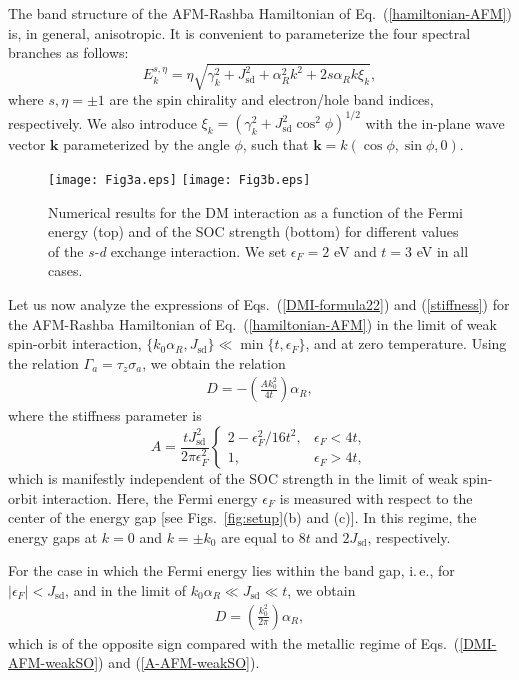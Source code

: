 \documentclass[aps,prl,twocolumn,amsmath,amssymb,superscriptaddress]{revtex4}%
\newcommand{\be}{\begin{equation}}
\newcommand{\e}{\end{equation}}
\newcommand{\bc}{\begin{cases}}
\newcommand{\ec}{\end{cases}}
\newcommand{\lt}{\left}
\newcommand{\rt}{\right}
\begin{document}
The band structure of the AFM-Rashba Hamiltonian of Eq.~(\ref{hamiltonian-AFM}) is, in general, anisotropic. It is convenient to parameterize the four spectral branches as follows:
\be
\label{energy-AFM}
E^{s,\eta}_k=\eta \sqrt{\gamma^2_k+J^2_{\mathrm{sd}}+\alpha^2_R k^2+2 s \alpha_R k \xi_k},
\e
where $s, \eta=\pm 1$ are the spin chirality and electron/hole band indices, respectively. We also introduce $\xi_k=\lt(\gamma^2_k+J^2_{\mathrm{sd}} \cos^2\phi\rt)^{1/2}$ with the in-plane wave vector $\bm{k}$ parameterized by the angle $\phi$, such that $\bm{k}=k(\cos\phi,\sin\phi,0)$.

\begin{figure}[t]
\texttt{[image: Fig3a.eps]}
\texttt{[image: Fig3b.eps]}
\caption{Numerical results for the DM interaction as a function of the Fermi energy (top) and of the SOC strength (bottom) for different values of the \textit{s-d} exchange interaction. We set $\epsilon_F=2$ eV and $t=3$ eV in all cases.}
\label{fig:results}
\end{figure}


Let us now analyze the expressions of Eqs.~(\ref{DMI-formula22}) and (\ref{stiffness}) for the AFM-Rashba Hamiltonian of Eq.~(\ref{hamiltonian-AFM}) in the limit of weak spin-orbit interaction, $\{k_0 \alpha_R, J_\mathrm{sd}\} \ll \min\{t, \epsilon_F\}$, and at zero temperature. Using the relation $\Gamma_a=\tau_z\sigma_a$, we obtain the relation
\begin{align}
\label{DMI-AFM-weakSO}
D = -\left(\frac{A k^2_0}{4 t}\right)\alpha_R ,
\end{align}
where the stiffness parameter is
\be
\label{A-AFM-weakSO}
A = \frac{t J^2_{\mathrm{sd}}}{2 \pi \epsilon^2_F}
\bc
2-\epsilon^2_F/16 t^2,& \epsilon_F < 4t, \\
1,& \epsilon_F > 4t,
\ec
\e
which is manifestly independent of the SOC strength in the limit of weak spin-orbit interaction. Here, the Fermi energy $\epsilon_F$ is measured with respect to the center of the energy gap [see Figs.~\ref{fig:setup}(b) and (c)]. In this regime, the energy gaps at $k=0$ and $k=\pm k_0$ are equal to $8t$ and $2J_{\mathrm{sd}}$, respectively.

For the case in which the Fermi energy lies within the band gap, i.\,e., for $|\epsilon_F| < J_{\mathrm{sd}}$,  and in the limit of $k_0 \alpha_R \ll J_{\mathrm{sd}} \ll t$, we obtain
\begin{align}
\label{DMI-AFM3}
D =\left(\frac{k^2_0}{2\pi}\right) \alpha_R,
\end{align}
which is of the opposite sign compared with the metallic regime of Eqs.~(\ref{DMI-AFM-weakSO}) and (\ref{A-AFM-weakSO}).
\end{document}
